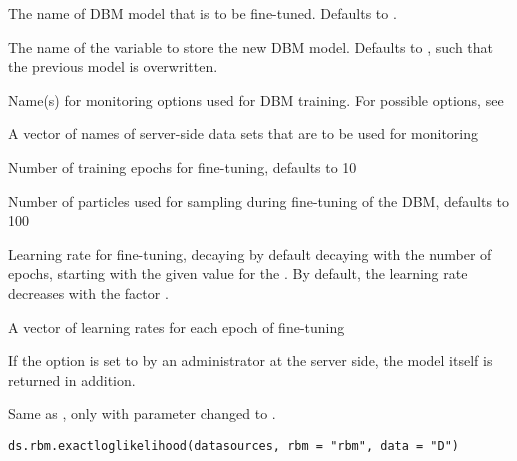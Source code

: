 \begin{Arguments}
\begin{ldescription}
\item[\code{dbm}] The name of DBM model that is to be fine-tuned. Defaults to .

\item[\code{newobj}] The name of the variable to store the new DBM model.
Defaults to , such that the previous model is overwritten.

\item[\code{monitoring}] Name(s) for monitoring options used for DBM training.
For possible options, see 

\item[\code{monitoringdata}] A vector of names of server-side data sets that are to be used for
monitoring

\item[\code{epochs}] Number of training epochs for fine-tuning, defaults to 10

\item[\code{nparticles}] Number of particles used for sampling during fine-tuning of the
DBM, defaults to 100

\item[\code{learningrate}] Learning rate for fine-tuning,
decaying by default decaying with the number of epochs,
starting with the given value for the .
By default, the learning rate decreases with the factor .

\item[\code{learningrates}] A vector of learning rates for each epoch of fine-tuning
\end{ldescription}
\end{Arguments}
%
\begin{Details}\relax
If the option  is set to 
by an administrator at the server side, the model itself is returned in addition.
\end{Details}
%
\begin{Description}\relax
Same as , only with parameter  changed to .
\end{Description}
%
\begin{Usage}
\begin{verbatim}
ds.rbm.exactloglikelihood(datasources, rbm = "rbm", data = "D")
\end{verbatim}
\end{Usage}
